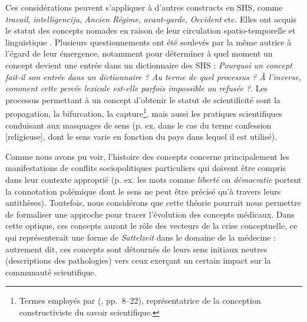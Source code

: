 Ces considérations peuvent s'appliquer à d'autres constructs en SHS, comme \textit{travail}, \textit{intelligencija}, \textit{Ancien Régime}, \textit{avant-garde}, \textit{Occident} etc. Elles ont acquis le statut des concepts \og{}nomades\fg{} en raison de leur circulation spatio-temporelle et linguistique \citep[p. 117]{ghermani2011}. Plusieurs questionnements ont été soulevés par la même autrice à l'égard de leur émergence, notamment pour déterminer à quel moment un concept devient une entrée dans un dictionnaire des \textsc{SHS} : \og{}\textit{Pourquoi un concept fait-il son entrée dans un dictionnaire ? Au terme de quel processus ? À l'inverse, comment cette percée lexicale est-elle parfois impossible ou refusée ?}\fg{}. Les processus permettant à un concept d'obtenir le statut de scientificité sont la propagation, la bifurcation, la capture\footnote{Termes employés par \citeauthor{stengers1987d} (\citeyear{stengers1987d}, pp.~8--22), représentatrice de la conception constructiviste du savoir scientifique.}, mais aussi les pratiques scientifiques conduisant aux masquages de sens (p. ex. dans le cas du terme \og{}confession [religieuse]\fg{}, dont le sens varie en fonction du pays dans lequel il est utilisé). 

Comme nous avons pu voir, l'histoire des concepts concerne principalement les manifestations de conflits sociopolitiques particuliers qui doivent être compris dans leur contexte approprié (p. ex. les mots comme \textit{liberté} ou \textit{démocratie} portent la connotation polémique dont le sens ne peut être précisé qu'à travers leurs antithèses). Toutefois, nous considérons que cette théorie pourrait nous permettre de formaliser une approche pour tracer l'évolution des concepts médicaux. Dans cette optique, ces concepts auront le rôle des vecteurs de la crise conceptuelle, ce qui représenterait une forme de \textit{Sattelzeit} dans le domaine de la médecine : autrement dit, ces concepts sont détournés de leurs sens initiaux neutres (descriptions des pathologies) vers ceux exerçant un certain impact sur la communauté scientifique. 






